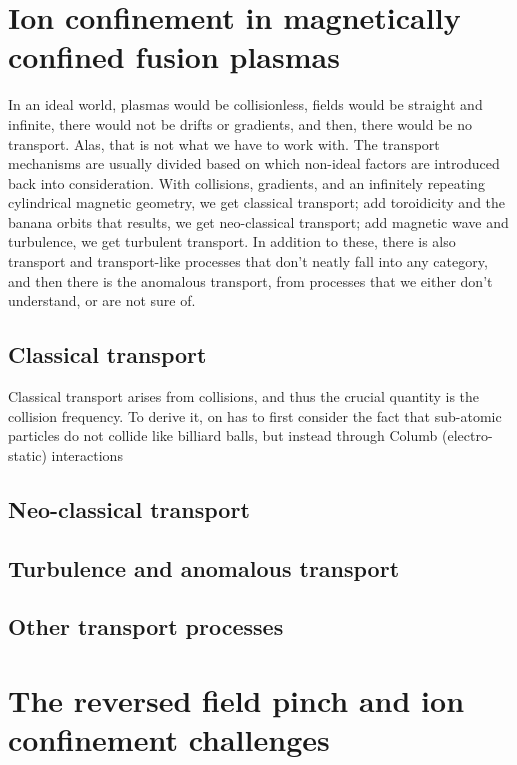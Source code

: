 \begin{refsection}
\section{Ion confinement in magnetically confined fusion plasmas}

In an ideal world, plasmas would be collisionless, fields would be straight and infinite, there would not be drifts or gradients, and then, there would be no transport. Alas, that is not what we have to work with. The transport mechanisms are usually divided based on which non-ideal factors are introduced back into consideration. With collisions, gradients, and an infinitely repeating cylindrical magnetic geometry, we get classical transport; add toroidicity and the banana orbits that results, we get neo-classical transport; add magnetic wave and turbulence, we get turbulent transport. In addition to these, there is also transport and transport-like processes that don't neatly fall into any category, and then there is the anomalous transport, from processes that we either don't understand, or are not sure of.

\subsection{Classical transport}

Classical transport arises from collisions, and thus the crucial quantity is the collision frequency. To derive it, on has to first consider the fact that sub-atomic particles do not collide like billiard balls, but instead through Columb (electro-static) interactions

\subsection{Neo-classical transport}

\subsection{Turbulence and anomalous transport}

\subsection{Other transport processes}

\section{The reversed field pinch and ion confinement challenges}


\end{refsection}
